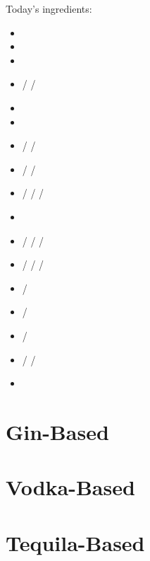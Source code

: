 \documentclass[11pt,dvipdfmx]{article}
\begin{document}
\maketitle

Today's ingredients:
\begin{itemize}
\item \gin
\item \vodka
\item \teq
\item \rum / \lrum / \bacardi
\item \ww
\item \sake
\item \campari / \cc / \kahlua
\item \oc / \wc / \cointreau
\item \oj / \pj / \lj / \limj
\item \mw
\item \soda / \tw / \llsoda / \ga
\item \gs / \gumsyrup / \sugar / \salt
\item \clime / \honey
\item \milk / \yogurt
\item \ew / \ey
\item \lemon / \lime / \mint
\item \cherry
\end{itemize}

\clearpage
\tableofcontents

\clearpage
\section{Gin-Based}





\clearpage




\clearpage




\clearpage
\section{Vodka-Based}





\clearpage



\clearpage
\section{Tequila-Based}
\end{document}
